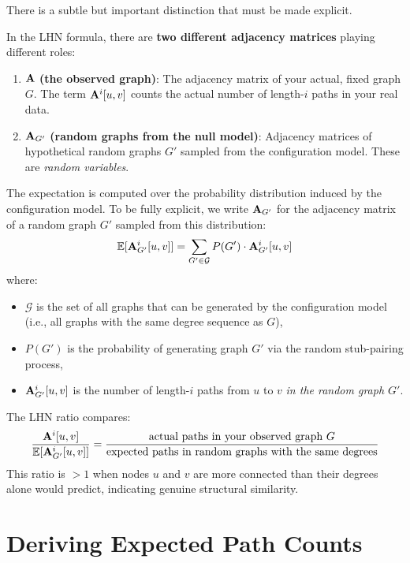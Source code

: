 \begin{notechapter}
There is a subtle but important distinction that must be made explicit.

\begin{warning}
In the LHN formula, there are \textbf{two different adjacency matrices} playing different roles:
\begin{enumerate}
    \item $\mathbf{A}$ \textbf{(the observed graph)}: The adjacency matrix of your actual, fixed graph $G$. The term $\mathbf{A}^i[u,v]$ counts the actual number of length-$i$ paths in your real data.
    \item $\mathbf{A}_{G'}$ \textbf{(random graphs from the null model)}: Adjacency matrices of hypothetical random graphs $G'$ sampled from the configuration model. These are \emph{random variables}.
\end{enumerate}
\end{warning}

The expectation is computed over the probability distribution induced by the configuration model. To be fully explicit, we write $\mathbf{A}_{G'}$ for the adjacency matrix of a random graph $G'$ sampled from this distribution:
\begin{equation}
\mathbb{E}[\mathbf{A}_{G'}^i[u,v]] = \sum_{G' \in \mathcal{G}} P(G') \cdot \mathbf{A}_{G'}^i[u,v]
\label{lhn-similarity:eq:expectation-formal}
\end{equation}
where:
\begin{itemize}
    \item $\mathcal{G}$ is the set of all graphs that can be generated by the configuration model (i.e., all graphs with the same degree sequence as $G$),
    \item $P(G')$ is the probability of generating graph $G'$ via the random stub-pairing process,
    \item $\mathbf{A}_{G'}^i[u,v]$ is the number of length-$i$ paths from $u$ to $v$ \emph{in the random graph $G'$}.
\end{itemize}

\begin{keyidea}
The LHN ratio compares:
\[
\frac{\mathbf{A}^i[u,v]}{\mathbb{E}[\mathbf{A}_{G'}^i[u,v]]} = \frac{\text{actual paths in your observed graph } G}{\text{expected paths in random graphs with the same degrees}}
\]
This ratio is $>1$ when nodes $u$ and $v$ are more connected than their degrees alone would predict, indicating genuine structural similarity.
\end{keyidea}

\section{Deriving Expected Path Counts}


\end{notechapter}
